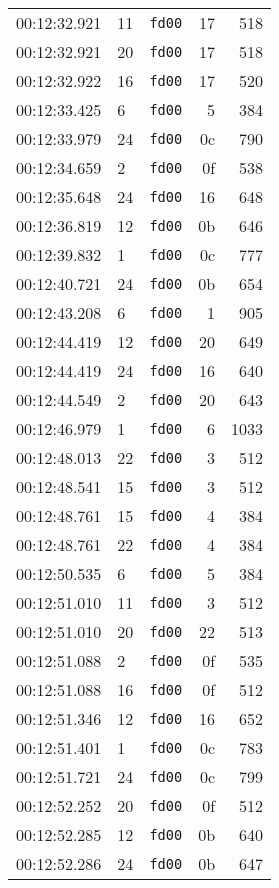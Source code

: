 \documentclass{article}
\begin{document}
\begin{longtable}{lllrr}
00:12:32.921 & 11 & \texttt{fd00} & 17 & 518 \\
00:12:32.921 & 20 & \texttt{fd00} & 17 & 518 \\
00:12:32.922 & 16 & \texttt{fd00} & 17 & 520 \\
00:12:33.425 & 6 & \texttt{fd00} & 5 & 384 \\
00:12:33.979 & 24 & \texttt{fd00} & 0c & 790 \\
00:12:34.659 & 2 & \texttt{fd00} & 0f & 538 \\
00:12:35.648 & 24 & \texttt{fd00} & 16 & 648 \\
00:12:36.819 & 12 & \texttt{fd00} & 0b & 646 \\
00:12:39.832 & 1 & \texttt{fd00} & 0c & 777 \\
00:12:40.721 & 24 & \texttt{fd00} & 0b & 654 \\
00:12:43.208 & 6 & \texttt{fd00} & 1 & 905 \\
00:12:44.419 & 12 & \texttt{fd00} & 20 & 649 \\
00:12:44.419 & 24 & \texttt{fd00} & 16 & 640 \\
00:12:44.549 & 2 & \texttt{fd00} & 20 & 643 \\
00:12:46.979 & 1 & \texttt{fd00} & 6 & 1033 \\
00:12:48.013 & 22 & \texttt{fd00} & 3 & 512 \\
00:12:48.541 & 15 & \texttt{fd00} & 3 & 512 \\
00:12:48.761 & 15 & \texttt{fd00} & 4 & 384 \\
00:12:48.761 & 22 & \texttt{fd00} & 4 & 384 \\
00:12:50.535 & 6 & \texttt{fd00} & 5 & 384 \\
00:12:51.010 & 11 & \texttt{fd00} & 3 & 512 \\
00:12:51.010 & 20 & \texttt{fd00} & 22 & 513 \\
00:12:51.088 & 2 & \texttt{fd00} & 0f & 535 \\
00:12:51.088 & 16 & \texttt{fd00} & 0f & 512 \\
00:12:51.346 & 12 & \texttt{fd00} & 16 & 652 \\
00:12:51.401 & 1 & \texttt{fd00} & 0c & 783 \\
00:12:51.721 & 24 & \texttt{fd00} & 0c & 799 \\
00:12:52.252 & 20 & \texttt{fd00} & 0f & 512 \\
00:12:52.285 & 12 & \texttt{fd00} & 0b & 640 \\
00:12:52.286 & 24 & \texttt{fd00} & 0b & 647 \\

\end{longtable}
\end{document}
